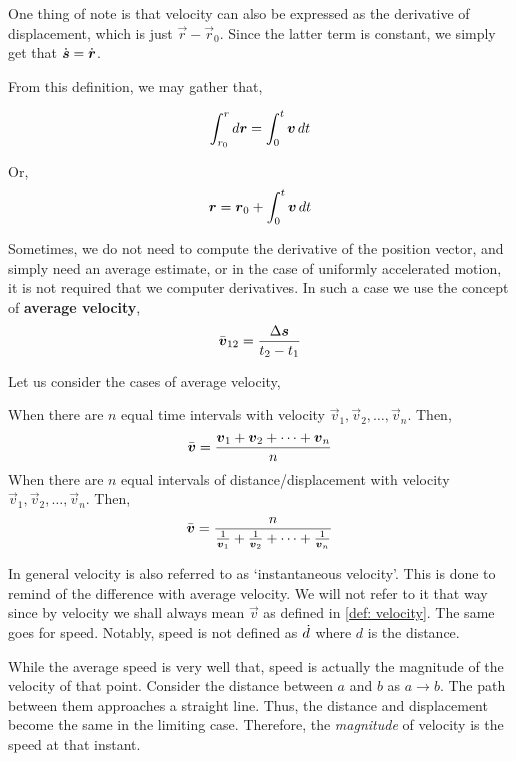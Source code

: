 One thing of note is that velocity can also be expressed as the derivative of 
displacement, which is just \(\vec{r} - \vec{r}_0\). Since the latter 
term is constant, we simply get that \(\dot{\boldsymbol{s}} = \dot{\boldsymbol{r}}\).

From this definition, we may gather that,

\[\int_{r_0}^{r} \mathop{}\!{d}{\boldsymbol{r}} = \int_{0}^{t} \boldsymbol{v} \mathop{}\!{d}{t}\]

Or, 
\begin{equation}
    \boldsymbol{r} = \boldsymbol{r}_0 + \int_{0}^{t} \boldsymbol{v} \mathop{}\!{d}{t}
\end{equation}

Sometimes, we do not need to compute the derivative of the position vector, and simply need an average
estimate, or in the case of uniformly accelerated motion, it is not required that we computer derivatives.
In such a case we use the concept of \textbf{average velocity}, \[
    \bar{\boldsymbol{v}}_{12} = \frac{\Delta\boldsymbol{s}}{t_2 - t_1}  
\]


\begin{algorithm}
    Let us consider the cases of average velocity,
    \begin{casework}
        \ii When there are \(n\) equal time intervals with velocity \(\vec{v}_1, \vec{v}_2, \ldots, \vec{v}_n\).
        Then, \[
            \bar{\boldsymbol{v}} = \frac{\boldsymbol{v}_1 + \boldsymbol{v}_2 + \dots + \boldsymbol{v}_n}{n} 
        \]
        \ii When there are \(n\) equal intervals of distance/displacement with velocity \(\vec{v}_1, \vec{v}_2, \ldots, \vec{v}_n\).
        Then, \[
            \bar{\boldsymbol{v}} = \frac{n}{\frac{1}{\boldsymbol{v}_1} + \frac{1}{\boldsymbol{v}_2} + \dots + \frac{1}{\boldsymbol{v}_n}} 
        \]
    \end{casework}
\end{algorithm}


In general velocity is also referred to as `instantaneous velocity'. This is done to remind of the difference
with average velocity. We will not refer to it that way since by velocity we shall always mean \(\vec{v}\) as defined in
\cref{def: velocity}. The same goes for speed. Notably, speed is not defined as \(\dot{d}\) where \(d\) is the distance.

While the average speed is very well that, speed is actually the magnitude of the velocity of that point. 
Consider the distance between \(a\) and \(b\) as 
\(a \to b\). The path between them approaches a straight line. Thus, the distance and displacement become the same
in the limiting case. Therefore, the \emph{magnitude} of velocity is the speed at that instant.

